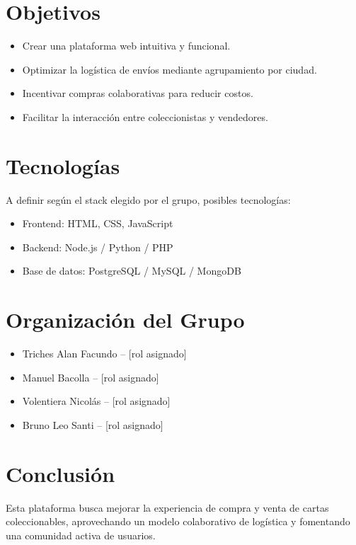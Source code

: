 \documentclass[a4paper,12pt]{article}
\begin{document}
\section{Objetivos}
\begin{itemize}
  \item Crear una plataforma web intuitiva y funcional.
  \item Optimizar la logística de envíos mediante agrupamiento por ciudad.
  \item Incentivar compras colaborativas para reducir costos.
  \item Facilitar la interacción entre coleccionistas y vendedores.
\end{itemize}

\section{Tecnologías}
A definir según el stack elegido por el grupo, posibles tecnologías:
\begin{itemize}
  \item Frontend: HTML, CSS, JavaScript
  \item Backend: Node.js / Python / PHP
  \item Base de datos: PostgreSQL / MySQL / MongoDB
\end{itemize}

\section{Organización del Grupo}
\begin{itemize}
  \item Triches Alan Facundo – [rol asignado]
  \item Manuel Bacolla – [rol asignado]
  \item Volentiera Nicolás – [rol asignado]
  \item Bruno Leo Santi – [rol asignado]
\end{itemize}

\section{Conclusión}
Esta plataforma busca mejorar la experiencia de compra y venta de cartas coleccionables, aprovechando un modelo colaborativo de logística y fomentando una comunidad activa de usuarios.
\end{document}
